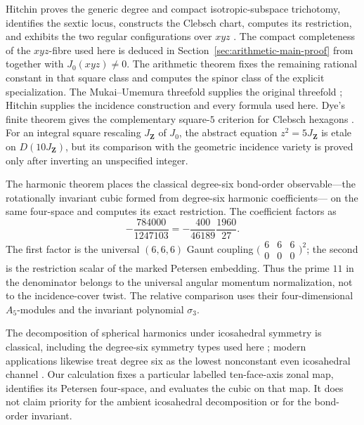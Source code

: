 Hitchin proves the generic degree and compact isotropic-subspace trichotomy,
identifies the sextic locus, constructs the Clebsch chart, computes its
restriction, and exhibits the two regular configurations over \(xyz\)
\cite[\S\S2--4, 7--10]{HitchinIcosahedron}
\cite[\S\S3--9]{HitchinBundles}.  The compact completeness of the
\(xyz\)-fibre used here is deduced in
Section~\ref{sec:arithmetic-main-proof} from
\cite[Theorem~5]{HitchinBundles} together with \(J_0(xyz)\ne0\).
The arithmetic theorem fixes the remaining
rational constant in that square class and computes the spinor class of the
explicit specialization.  The Mukai--Umemura threefold supplies the
original threefold \cite{MukaiUmemura}; Hitchin supplies the incidence
construction and every formula used here.  Dye's finite theorem gives the
complementary square-\(5\) criterion for Clebsch hexagons
\cite{DyeClebsch}.  For an integral square rescaling \(J_{\mathbf Z}\) of
\(J_0\), the abstract equation \(z^2=5J_{\mathbf Z}\) is etale on
\(D(10J_{\mathbf Z})\), but its
comparison with the geometric incidence variety is proved only after
inverting an unspecified integer.

The harmonic theorem places the classical degree-six bond-order
observable---the rotationally
invariant cubic formed from degree-six harmonic coefficients---
\cite{SNR1981,SNR1983} on the same four-space and computes its exact
restriction.  The coefficient factors as
\[
 -\frac{784000}{1247103}
 =-\frac{400}{46189}\frac{1960}{27}.
\]
The first factor is the universal \((6,6,6)\) Gaunt coupling
\(\bigl(\begin{smallmatrix}6&6&6\\0&0&0\end{smallmatrix}\bigr)^2\);
the second is the restriction scalar of the marked Petersen embedding.
Thus the prime \(11\) in the denominator belongs to the universal angular
momentum normalization, not to the incidence-cover twist.  The relative comparison
uses their four-dimensional \(A_5\)-modules and the invariant polynomial
\(\sigma_3\).

The decomposition of spherical harmonics under icosahedral symmetry is
classical, including the degree-six symmetry types used here
\cite{MeyerHarmonics,CohanHarmonics}; modern applications likewise treat
degree six as the lowest nonconstant even icosahedral channel
\cite{DharmavaramCapsids}.  Our calculation fixes a particular labelled
ten-face-axis zonal map, identifies its Petersen four-space, and evaluates
the cubic on that map.  It does not claim priority for the ambient
icosahedral decomposition or for the bond-order invariant.
